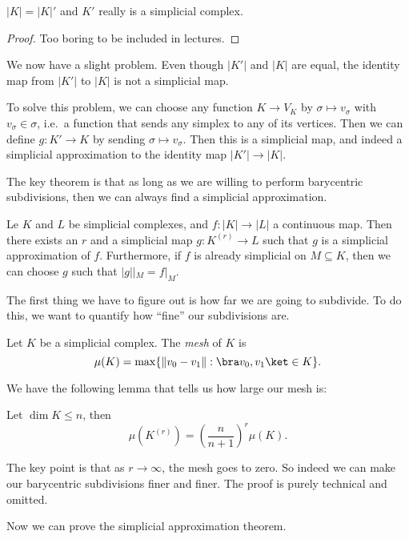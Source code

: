 \documentclass[a4paper]{article}
\begin{document}
\begin{prop}
  $|K| = |K|'$ and $K'$ really is a simplicial complex.
\end{prop}

\begin{proof}
  Too boring to be included in lectures.
\end{proof}

We now have a slight problem. Even though $|K'|$ and $|K|$ are equal, the identity map from $|K'|$ to $|K|$ is not a simplicial map.

To solve this problem, we can choose any function $K \to V_K$ by $\sigma \mapsto v_\sigma$ with $v_\sigma \in \sigma$, i.e.\ a function that sends any simplex to any of its vertices. Then we can define $g: K' \to K$ by sending $\hat{\sigma} \mapsto v_\sigma$. Then this is a simplicial map, and indeed a simplicial approximation to the identity map $|K'| \to |K|$.

The key theorem is that as long as we are willing to perform barycentric subdivisions, then we can always find a simplicial approximation.

\begin{thm}
  Le $K$ and $L$ be simplicial complexes, and $f: |K| \to |L|$ a continuous map. Then there exists an $r$ and a simplicial map $g: K^{(r)} \to L$ such that $g$ is a simplicial approximation of $f$. Furthermore, if $f$ is already simplicial on $M\subseteq K$, then we can choose $g$ such that $|g||_M = f|_M$.
\end{thm}

The first thing we have to figure out is how far we are going to subdivide. To do this, we want to quantify how ``fine'' our subdivisions are.
\begin{defi}[Mesh]
  Let $K$ be a simplicial complex. The \emph{mesh} of $K$ is
  \[
    \mu(K) = \max\{\|v_0 - v_1\| : \bra v_0, v_1\ket \in K\}.
  \]
\end{defi}

We have the following lemma that tells us how large our mesh is:
\begin{lemma}
  Let $\dim K \leq n$, then
  \[
    \mu(K^{(r)}) = \left(\frac{n}{n + 1}\right)^r \mu(K).
  \]
\end{lemma} %
The key point is that as $r \to \infty$, the mesh goes to zero. So indeed we can make our barycentric subdivisions finer and finer. The proof is purely technical and omitted.

Now we can prove the simplicial approximation theorem.
\end{document}
